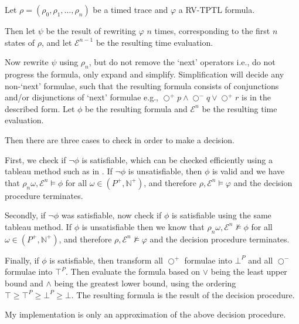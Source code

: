 \documentclass[a4paper]{article}
\newcommand{\sn}{\bigcirc^+}
\newcommand{\wn}{\bigcirc^-}
\newcommand{\eval}{\mathcal{E}}
\begin{document}
\begin{defn}\label{decision}
  Let $\rho=(\rho_0,\rho_1,\dots,\rho_n)$ be a timed trace and $\varphi$ a RV-TPTL formula.

  Then let $\psi$ be the result of rewriting $\varphi$ $n$ times, corresponding to the first $n$ states of $\rho$, and let $\eval^{n-1}$ be the resulting time evaluation.

  Now rewrite $\psi$ using $\rho_n$, but do not remove the `next' operators i.e., do not progress the formula, only expand and simplify.
  Simplification will decide any non-`next' formulae, such that the resulting formula consists of conjunctions and/or disjunctions of `next' formulae e.g., $\sn p \land \wn q \lor \sn r$ is in the described form. Let $\phi$ be the resulting formula and $\eval^n$ be the resulting time evaluation.

  Then there are three cases to check in order to make a decision.

  First, we check if $\neg\phi$ is satisfiable, which can be checked efficiently using a tableau method such as in \textcite{alur1994really}. If $\neg\phi$ is unsatisfiable, then $\phi$ is valid and we have that $\rho_n\omega, \eval^n \vDash \phi$ for all $\omega\in (P^+,\mathbb{N}^+)$, and therefore $\rho,\eval^n \vDash \varphi$ and the decision procedure terminates.

  Secondly, if $\neg\phi$ was satisfiable, now check if $\phi$ is satisfiable using the same tableau method. If $\phi$ is unsatisfiable then we know that $\rho_n\omega, \eval^n \nvDash \phi$ for all $\omega\in (P^+,\mathbb{N}^+)$, and therefore $\rho,\eval^n \nvDash \varphi$ and the decision procedure terminates.

  Finally, if $\phi$ is satisfiable, then transform all $\sn$ formulae into $\bot^P$ and all $\wn$ formulae into $\top^P$. Then evaluate the formula based on $\lor$ being the least upper bound and $\land$ being the greatest lower bound, using the ordering $\top \geq \top^P \geq \bot^P \geq \bot$. The resulting formula is the result of the decision procedure.
\end{defn}

My implementation is only an approximation of the above decision procedure.
\end{document}
